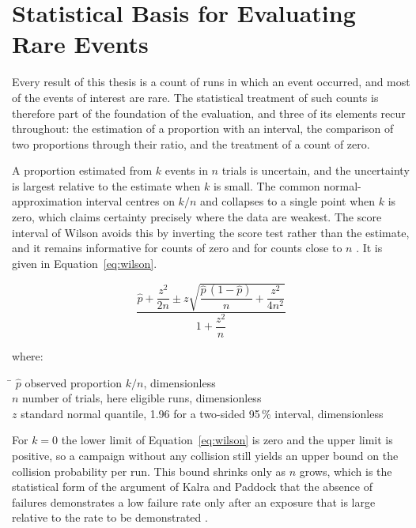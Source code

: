 \section{Statistical Basis for Evaluating Rare Events}
\label{sec:fund_statistics}

Every result of this thesis is a count of runs in which an event occurred, and most of
the events of interest are rare. The statistical treatment of such counts is
therefore part of the foundation of the evaluation, and three of its elements recur
throughout: the estimation of a proportion with an interval, the comparison of two
proportions through their ratio, and the treatment of a count of zero.

A proportion estimated from $k$ events in $n$ trials is uncertain, and the uncertainty
is largest relative to the estimate when $k$ is small. The common normal-approximation
interval centres on $k/n$ and collapses to a single point when $k$ is zero, which
claims certainty precisely where the data are weakest. The score interval of Wilson
avoids this by inverting the score test rather than the estimate, and it remains
informative for counts of zero and for counts close to $n$
\cite{wilson1927probable}. It is given in Equation~\eqref{eq:wilson}.

\begin{equation}
    \frac{\hat{p} + \dfrac{z^{2}}{2n} \pm z\sqrt{\dfrac{\hat{p}\,(1-\hat{p})}{n} + \dfrac{z^{2}}{4n^{2}}}}
    {1 + \dfrac{z^{2}}{n}}
    \label{eq:wilson}
\end{equation}

where:\nopagebreak
\begin{tabbing}
    \hspace{2.2cm} \= \kill
    $\hat{p}$ \> observed proportion $k/n$, dimensionless \\
    $n$ \> number of trials, here eligible runs, dimensionless \\
    $z$ \> standard normal quantile, 1.96 for a two-sided 95\,\% interval, dimensionless
\end{tabbing}

For $k = 0$ the lower limit of Equation~\eqref{eq:wilson} is zero and the upper limit
is positive, so a campaign without any collision still yields an upper bound on the
collision probability per run. This bound shrinks only as $n$ grows, which is the
statistical form of the argument of Kalra and Paddock that the absence of failures
demonstrates a low failure rate only after an exposure that is large relative to the
rate to be demonstrated \cite{kalra2016driving}.

